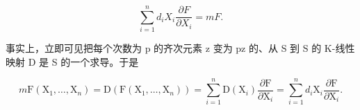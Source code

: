 \[
\sum_ {i = 1} ^ {n} d _ {i} X _ {i} \frac {\partial F}{\partial X _ {i}} = m F.\tag{5}
\]

事实上，立即可见把每个次数为 p 的齐次元素 z 变为 pz 的、从 S 到 S 的 K-线性映射 D 是 S 的一个求导。于是

\[
m \mathrm{F} (\mathrm{X} _ {1}, \dots , \mathrm{X} _ {n}) = \mathrm{D} (\mathrm{F} (\mathrm{X} _ {1}, \dots , \mathrm{X} _ {n})) = \sum_ {i = 1} ^ {n} \mathrm{D} (\mathrm{X} _ {i}) \frac {\partial \mathrm{F}}{\partial \mathrm{X} _ {i}} = \sum_ {i = 1} ^ {n} d _ {i} \mathrm{X} _ {i} \frac {\partial \mathrm{F}}{\partial \mathrm{X} _ {i}}.
\]

